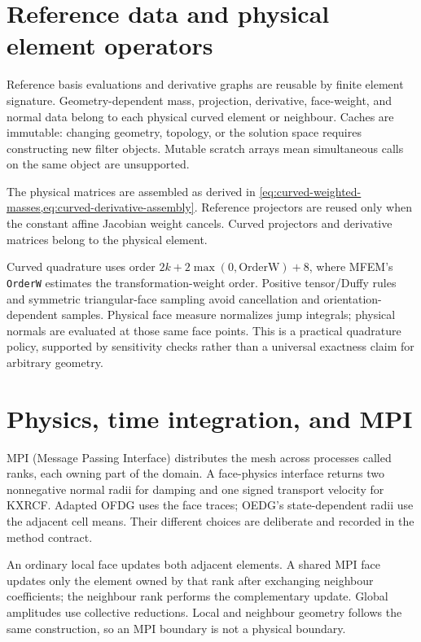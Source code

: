 

\section{Reference data and physical element operators}
\label{sec:curved-construction}
Reference basis evaluations and derivative graphs are reusable by finite
element signature. Geometry-dependent mass, projection, derivative, face-weight,
and normal data belong to each physical curved element or neighbour. Caches
are immutable: changing geometry, topology, or the solution space requires
constructing new filter objects. Mutable scratch arrays mean simultaneous
calls on the same object are unsupported.

The physical matrices are assembled as derived in
\cref{eq:curved-weighted-masses,eq:curved-derivative-assembly}. Reference
projectors are reused only when the constant affine Jacobian weight cancels.
Curved projectors and derivative matrices belong to the physical element.

Curved quadrature uses order $2k+2\max(0,\mathrm{OrderW})+8$, where MFEM's
\texttt{OrderW} estimates the transformation-weight order. Positive tensor/Duffy
rules and symmetric triangular-face sampling avoid cancellation and
orientation-dependent samples. Physical face measure normalizes jump integrals;
physical normals are evaluated at those same face points. This is a practical
quadrature policy, supported by sensitivity checks rather than a universal
exactness claim for arbitrary geometry.

\section{Physics, time integration, and MPI}
MPI (Message Passing Interface) distributes the mesh across processes called
ranks, each owning part of the domain.
A face-physics interface returns two nonnegative normal radii for damping and
one signed transport velocity for KXRCF. Adapted OFDG uses the face traces;
OEDG's state-dependent radii use the adjacent cell means. Their different
choices are deliberate and recorded in the method contract.

An ordinary local face updates both adjacent elements. A shared MPI face
updates only the element owned by that rank after exchanging neighbour
coefficients; the neighbour rank performs the complementary update. Global
amplitudes use collective reductions. Local and neighbour geometry follows the
same construction, so an MPI boundary is not a physical boundary.

